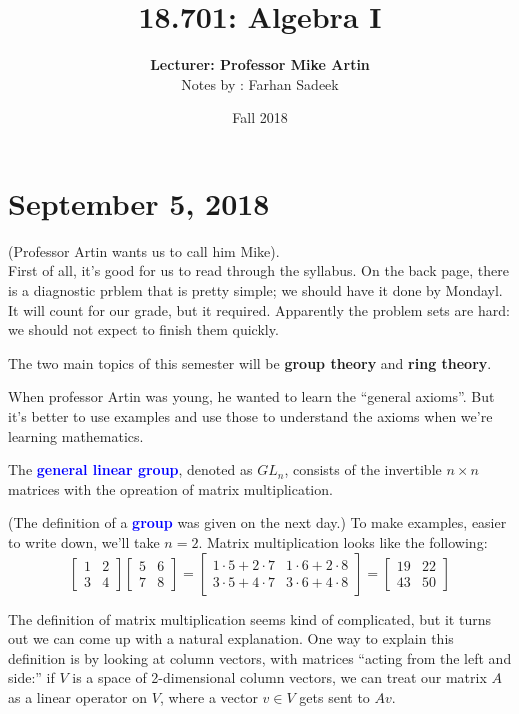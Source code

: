 \documentclass[11pt]{article}
\title{\textbf{18.701: Algebra I}}
\author{\textbf{Lecturer: Professor Mike Artin} \\ Notes by : Farhan Sadeek}
\date{Fall 2018}
\begin{document}
\maketitle
\section{September 5, 2018}
 (Professor Artin wants us to call him Mike). \\
First of all, it's good for us to read through the syllabus. On the back page, there is a diagnostic prblem that is pretty simple; we should have it done by Mondayl. It will count for our grade, but it  required. Apparently the problem sets are hard: we should not expect to finish them quickly.
\begin{fact}
    The two main topics of this semester will be \textbf{group theory} and \textbf{ring theory}.
\end{fact}
When professor Artin was young, he wanted to learn the ``general axioms''. But it's better to use examples and use those to understand the axioms when we're learning mathematics.

\begin{definition}
    The \textcolor{blue}{\textbf{general linear group}}, denoted as $GL_n$, consists of the invertible $n \times n$ matrices with the opreation of matrix multiplication.
\end{definition}

(The definition of a \textcolor{blue}{\textbf{group}} was given on the next day.) To make examples, easier to write down, we'll take $n = 2$. Matrix multiplication looks like the following:
\[
    \begin{bmatrix}
        1 & 2 \\
        3 & 4
    \end{bmatrix}
    \begin{bmatrix}
        5 & 6 \\
        7 & 8
    \end{bmatrix}
    =
    \begin{bmatrix}
        1 \cdot 5 + 2 \cdot 7 & 1 \cdot 6 + 2 \cdot 8 \\
        3 \cdot 5 + 4 \cdot 7 & 3 \cdot 6 + 4 \cdot 8
    \end{bmatrix}
    =
    \begin{bmatrix}
        19 & 22 \\
        43 & 50
    \end{bmatrix}
\]

The definition of matrix multiplication seems kind of complicated, but it turns
out we can come up with a natural explanation. One way to explain this
definition is by looking at column vectors, with matrices ``acting from the
left and side:'' if $V$ is a space of 2-dimensional column vectors, we can
treat our matrix $A$ as a linear operator on $V$, where a vector $v \in V$ gets
sent to $Av$.
\end{document}
